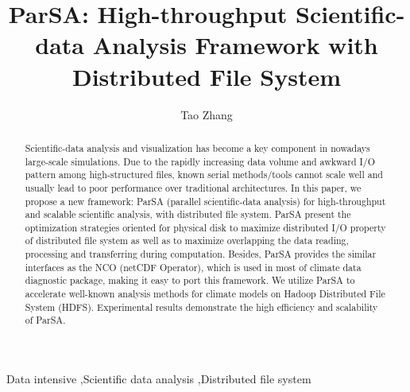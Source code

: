 \documentclass[preprint,12pt]{elsarticle}
\begin{document}
\begin{frontmatter}



\title{ParSA: High-throughput Scientific-data Analysis Framework with Distributed File System}


\author{Tao Zhang}

\address{Tsinghua}

\begin{abstract}
Scientific-data analysis and visualization has become a key component in nowadays large-scale simulations. Due to the rapidly
increasing data volume and awkward I/O pattern among high-structured files, known serial methods/tools cannot scale well and 
usually lead to poor performance over traditional architectures. In this paper, we propose a new framework: ParSA 
(parallel scientific-data analysis) for high-throughput and scalable scientific analysis, with distributed file system. ParSA
present the optimization strategies oriented for physical disk to maximize distributed I/O property of distributed file system as
well as to maximize overlapping the data reading, processing and transferring during computation. Besides, ParSA provides the similar interfaces as the NCO (netCDF Operator), which is used in most of climate data diagnostic package, making
it easy to port this framework. We utilize ParSA to accelerate well-known analysis methods for climate models on Hadoop Distributed File System (HDFS). Experimental results demonstrate the high efficiency and scalability of ParSA. 
\end{abstract}

\begin{keyword}


Data intensive \sep Scientific data analysis \sep Distributed file system
\end{keyword}

\end{frontmatter}
\end{document}
